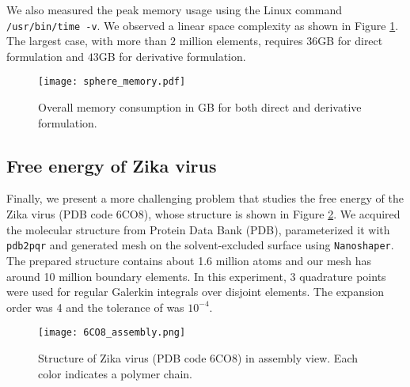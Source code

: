 We also measured the peak memory usage using the Linux command \texttt{/usr/bin/time -v}.
We observed a linear space complexity as shown in Figure \ref{fig:sphere_memory}.
The largest case, with more than $2$ million elements, requires $36$GB for direct formulation and $43$GB for derivative formulation.

\begin{figure}%
    \centering
    \texttt{[image: sphere\_memory.pdf]} 
    \caption{Overall memory consumption in GB for both direct and derivative formulation.}
    \label{fig:sphere_memory}
\end{figure}

\subsection{Free energy of Zika virus}

Finally, we present a more challenging problem that studies the free energy of the Zika virus (PDB code 6CO8), whose structure \cite{sevvana2018refinement} is shown in Figure \ref{fig:6CO8_assembly}.
We acquired the molecular structure from Protein Data Bank (PDB), parameterized it with \texttt{pdb2pqr} and generated mesh on the solvent-excluded surface using \texttt{Nanoshaper}.
The prepared structure contains about 1.6 million atoms and our mesh has around 10 million boundary elements.
In this experiment, 3 quadrature points were used for regular Galerkin integrals over disjoint elements.
The \fmm expansion order was 4 and the tolerance of \gmres was $10^{-4}$.

\begin{figure}%
    \centering
    \texttt{[image: 6CO8\_assembly.png]} 
    \caption{Structure of Zika virus (PDB code 6CO8) in assembly view. Each color indicates a polymer chain.}
    \label{fig:6CO8_assembly}
\end{figure}

